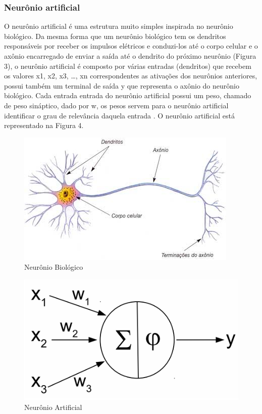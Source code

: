 \subsubsection{Neurônio artificial}
O neurônio artificial é uma estrutura muito simples inspirada no neurônio biológico. Da mesma forma que um neurônio biológico tem os dendritos responsáveis por receber os impulsos elétricos e conduzi-los até o corpo celular e o axônio encarregado de enviar a saída até o dendrito do próximo neurônio (Figura 3), o neurônio artificial é composto por várias entradas (dendritos) que recebem os valores x1, x2, x3, …, xn correspondentes as ativações dos neurônios anteriores, possui também um terminal de saída y que representa o axônio do neurônio biológico. Cada entrada entrada do neurônio artificial possui um peso, chamado de peso sináptico, dado por w, os pesos servem para o neurônio artificial identificar o grau de relevância daquela entrada \cite{BRAGA}. O neurônio artificial está representado na Figura 4.

\begin{figure}[htb]
 \centering
 	\caption{Neurônio Biológico}
 	\label{fig:Neurônio Biológico}
 	\includegraphics[scale=1.8]{figuras/neuronio-biologico.jpg}
 \end{figure}
 
\begin{figure}[htb]
 \centering
 	\caption{Neurônio Artificial}
 	\label{fig:Neurônio Artificial}
 	\includegraphics[scale=0.9]{figuras/neuronio-artificial.png}
 \end{figure}
 
